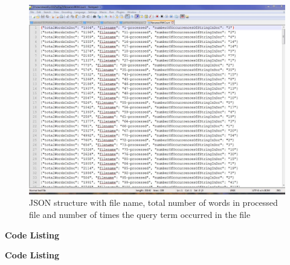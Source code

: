 \newpage
\begin{figure}[h!]
\begin{center}
\hspace*{-1.5in}
\includegraphics[scale=0.55, keepaspectratio=true]{figures/JSONstructure.JPG}
\caption{JSON structure with file name, total number of words in processed file and number of times the query term occurred in the file}
\label{fig:q2fig3}
\end{center}
\end{figure}


\newpage
\textbf{Code Listing}


\newpage
\textbf{Code Listing}



